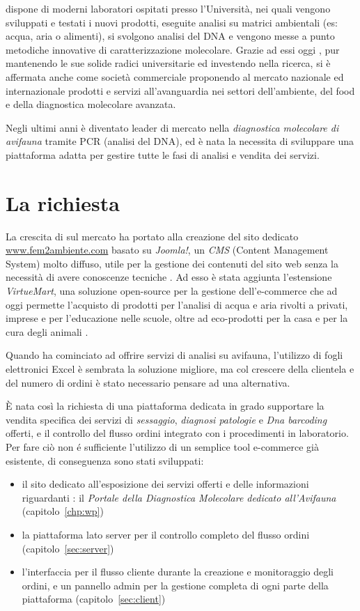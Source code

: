 {\fem} dispone di moderni laboratori ospitati presso l’Università, nei quali vengono sviluppati e testati i nuovi prodotti, eseguite analisi su matrici ambientali (es: acqua, aria o alimenti), si svolgono analisi del DNA e vengono messe a punto metodiche innovative di caratterizzazione molecolare. Grazie ad essi oggi {\fem}, pur mantenendo le sue solide radici universitarie ed investendo nella ricerca, si è affermata anche come società commerciale proponendo al mercato nazionale ed internazionale prodotti e servizi all'avanguardia nei settori dell'ambiente, del food e della diagnostica molecolare avanzata.

Negli ultimi anni è diventato leader di mercato nella \emph{diagnostica molecolare di avifauna} tramite PCR (analisi del DNA), ed è nata la necessita di sviluppare una piattaforma adatta per gestire tutte le fasi di analisi e vendita dei servizi.

\section{La richiesta}
\label{sec:richiesta}
La crescita di {\fem} sul mercato ha portato alla creazione del sito dedicato \url{www.fem2ambiente.com} basato su \emph{Joomla!}, un \emph{CMS} (Content Management System) molto diffuso, utile per la gestione dei contenuti del sito web senza la necessità di avere conoscenze tecniche \cite{joomla}. Ad esso è stata aggiunta l'estensione \emph{VirtueMart}, una soluzione open-source per la gestione dell'e-commerce che ad oggi permette l'acquisto di prodotti per l'analisi di acqua e aria rivolti a privati, imprese e per l'educazione nelle scuole, oltre ad eco-prodotti per la casa e per la cura degli animali \cite{virtuemart}.

Quando {\fem} ha cominciato ad offrire servizi di analisi su avifauna, l'utilizzo di fogli elettronici Excel è sembrata la soluzione migliore, ma col crescere della clientela e del numero di ordini è stato necessario pensare ad una alternativa. 

È nata così la richiesta di una piattaforma dedicata in grado supportare la vendita specifica dei servizi di \emph{sessaggio}, \emph{diagnosi patologie} e \emph{Dna barcoding} offerti, e il controllo del flusso ordini integrato con i procedimenti in laboratorio. Per fare ciò non é sufficiente l'utilizzo di un semplice tool e-commerce già esistente, di conseguenza sono stati sviluppati:
\begin{itemize}
\item il sito dedicato all'esposizione dei servizi offerti e delle informazioni riguardanti {\fem}: il \emph{Portale della Diagnostica Molecolare dedicato all'Avifauna} (capitolo~\ref{chp:wp})
\item la piattaforma lato server per il controllo completo del flusso ordini (capitolo~\ref{sec:server})
\item l'interfaccia per il flusso cliente durante la creazione e monitoraggio degli ordini, e un pannello admin per la gestione completa di ogni parte della piattaforma (capitolo~\ref{sec:client})
\end{itemize}

